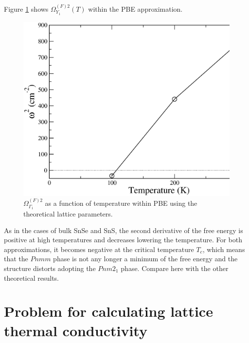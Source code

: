 Figure \ref{freq-transition-mono} shows $\Omega^{(F)2}_{Y_{1}}(T)$ within the PBE approximation.
\begin{figure}[h]
\includegraphics[width=\linewidth]{Figures/freq-mono.eps}
\caption[Phonon collapse in monolayer SnSe.]{$\Omega^{(F)2}_{\Gamma_{1}}$ as a function of temperature within PBE 
using the theoretical lattice parameters.}
\label{freq-transition-mono}
\end{figure}
As in the cases of bulk SnSe and SnS, the second derivative of the free energy is positive at high temperatures and 
decreases lowering the temperature. For both approximations, it becomes negative at the critical temperature $T_c$, 
which means that the $Pnmm$ phase is not any longer a minimum of the free energy and the structure distorts adopting 
the $Pnm2_{1}$ phase. Compare here with the other theoretical results.

\section{Problem for calculating lattice thermal conductivity}

